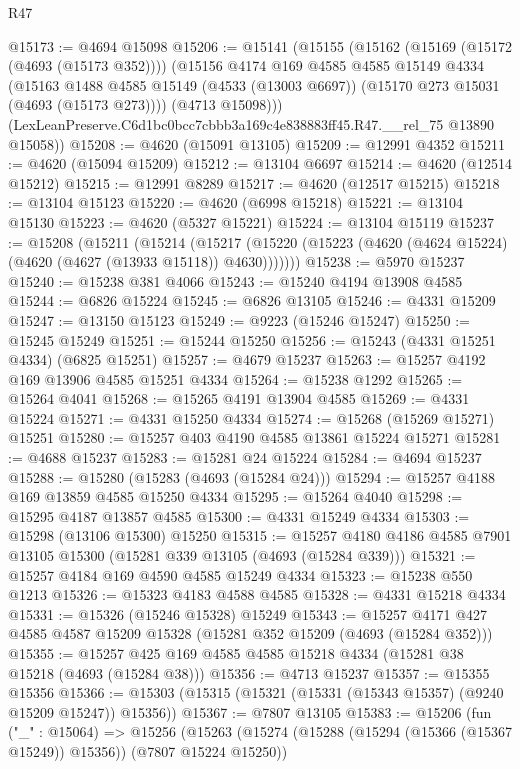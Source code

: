 \begin{lexlean}{R47}
\begin{coremodule}
@15173 := @4694 @15098
@15206 := @15141
    (@15155
      (@15162
        (@15169 (@15172 (@4693 (@15173 @352))))
        (@15156
          @4174
          @169
          @4585
          @4585
          @15149
          @4334
          (@15163
            @1488
            @4585
            @15149
            (@4533 (@13003 @6697))
            (@15170 @273 @15031 (@4693 (@15173 @273))))
          (@4713 @15098)))
      (LexLeanPreserve.C6d1bc0bcc7cbbb3a169c4e838883ff45.R47.__rel_75 @13890 @15058))
@15208 := @4620 (@15091 @13105)
@15209 := @12991 @4352
@15211 := @4620 (@15094 @15209)
@15212 := @13104 @6697
@15214 := @4620 (@12514 @15212)
@15215 := @12991 @8289
@15217 := @4620 (@12517 @15215)
@15218 := @13104 @15123
@15220 := @4620 (@6998 @15218)
@15221 := @13104 @15130
@15223 := @4620 (@5327 @15221)
@15224 := @13104 @15119
@15237 := @15208
    (@15211
      (@15214
        (@15217 (@15220 (@15223 (@4620 (@4624 @15224) (@4620 (@4627 (@13933 @15118)) @4630)))))))
@15238 := @5970 @15237
@15240 := @15238 @381 @4066
@15243 := @15240 @4194 @13908 @4585
@15244 := @6826 @15224
@15245 := @6826 @13105
@15246 := @4331 @15209
@15247 := @13150 @15123
@15249 := @9223 (@15246 @15247)
@15250 := @15245 @15249
@15251 := @15244 @15250
@15256 := @15243 (@4331 @15251 @4334) (@6825 @15251)
@15257 := @4679 @15237
@15263 := @15257 @4192 @169 @13906 @4585 @15251 @4334
@15264 := @15238 @1292
@15265 := @15264 @4041
@15268 := @15265 @4191 @13904 @4585
@15269 := @4331 @15224
@15271 := @4331 @15250 @4334
@15274 := @15268 (@15269 @15271) @15251
@15280 := @15257 @403 @4190 @4585 @13861 @15224 @15271
@15281 := @4688 @15237
@15283 := @15281 @24 @15224
@15284 := @4694 @15237
@15288 := @15280 (@15283 (@4693 (@15284 @24)))
@15294 := @15257 @4188 @169 @13859 @4585 @15250 @4334
@15295 := @15264 @4040
@15298 := @15295 @4187 @13857 @4585
@15300 := @4331 @15249 @4334
@15303 := @15298 (@13106 @15300) @15250
@15315 := @15257 @4180 @4186 @4585 @7901 @13105 @15300 (@15281 @339 @13105 (@4693 (@15284 @339)))
@15321 := @15257 @4184 @169 @4590 @4585 @15249 @4334
@15323 := @15238 @550 @1213
@15326 := @15323 @4183 @4588 @4585
@15328 := @4331 @15218 @4334
@15331 := @15326 (@15246 @15328) @15249
@15343 := @15257 @4171 @427 @4585 @4587 @15209 @15328 (@15281 @352 @15209 (@4693 (@15284 @352)))
@15355 := @15257 @425 @169 @4585 @4585 @15218 @4334 (@15281 @38 @15218 (@4693 (@15284 @38)))
@15356 := @4713 @15237
@15357 := @15355 @15356
@15366 := @15303 (@15315 (@15321 (@15331 (@15343 @15357) (@9240 @15209 @15247)) @15356))
@15367 := @7807 @13105
@15383 := @15206
    (fun ("_" : @15064) =>
    @15256
      (@15263
        (@15274 (@15288 (@15294 (@15366 (@15367 @15249)) @15356)) (@7807 @15224 @15250))

\end{coremodule}
\end{lexlean}
